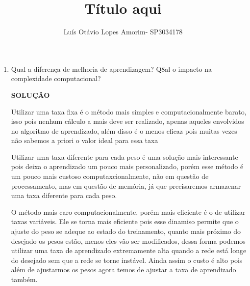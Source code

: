 \documentclass[a4paper, 12pt]{article}
\title{Título aqui}
\author{Luís Otávio Lopes Amorim- SP3034178}
\newcommand{\solucao}{
\begin{center}
\textbf{SOLUÇÃO}
\end{center}}
\begin{document}
\maketitle
\begin{enumerate}
\item Qual a diferença de melhoria de aprendizagem? Q8al o impacto na complexidade computacional?

\solucao

Utilizar uma taxa fixa é o método mais simples e computacionalmente barato, isso pois nenhum cálculo a mais deve ser realizado, apenas aqueles envolvidos no algoritmo de aprendizado, além disso é o menos eficaz pois muitas vezes não sabemos a priori o valor ideal para essa taxa

Utilizar uma taxa diferente para cada peso é uma solução mais interessante pois deixa o aprendizado um pouco mais personalizado, porém esse método é um pouco mais custoso computaxcionalmente, não em questão de processamento, mas em questão de memória, já que precisaremos armazenar uma taxa diferente para cada peso.

O método mais caro computacionalmente, porém mais eficiente é o de utilizar taxas variáveis. Ele se torna mais eficiente pois esse dinamiso permite que o ajuste do peso se adeque ao estado do treinamento, quanto mais próximo do desejado os pesos estão, menos eles vão ser modificados, dessa forma podemos utilizar uma taxa de aprendizado extremamente alta quando a rede está longe do desejado sem que a rede se torne instável. Ainda assim o custo é alto pois além de ajustarmos os pesos agora temos de ajustar a taxa de aprendizado também.
\end{enumerate}
\end{document}
